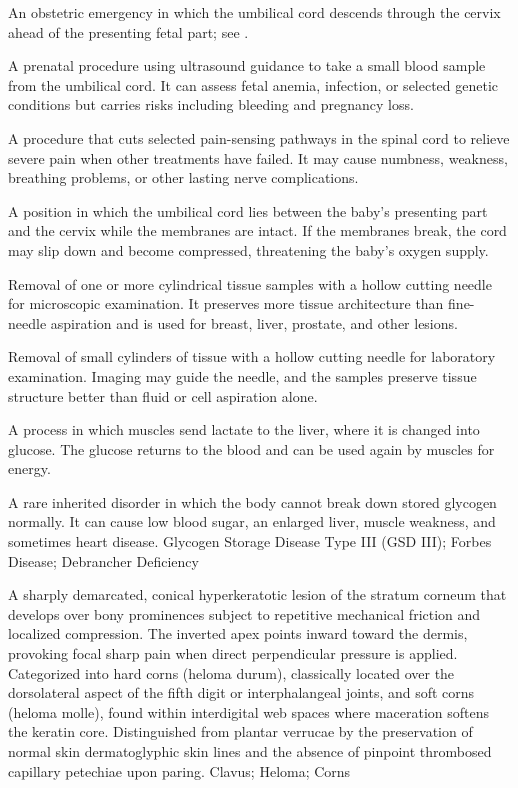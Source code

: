  An obstetric emergency in which the umbilical cord descends through the cervix ahead of the presenting fetal part; see .

 A prenatal procedure using ultrasound guidance to take a small blood sample from the umbilical cord. It can assess fetal anemia, infection, or selected genetic conditions but carries risks including bleeding and pregnancy loss.

 A procedure that cuts selected pain-sensing pathways in the spinal cord to relieve severe pain when other treatments have failed. It may cause numbness, weakness, breathing problems, or other lasting nerve complications.

 A position in which the umbilical cord lies between the baby's presenting part and the cervix while the membranes are intact. If the membranes break, the cord may slip down and become compressed, threatening the baby's oxygen supply.

 Removal of one or more cylindrical tissue samples with a hollow cutting needle for microscopic examination. It preserves more tissue architecture than fine-needle aspiration and is used for breast, liver, prostate, and other lesions.

 Removal of small cylinders of tissue with a hollow cutting needle for laboratory examination. Imaging may guide the needle, and the samples preserve tissue structure better than fluid or cell aspiration alone.

 A process in which muscles send lactate to the liver, where it is changed into glucose. The glucose returns to the blood and can be used again by muscles for energy.

 A rare inherited disorder in which the body cannot break down stored glycogen normally. It can cause low blood sugar, an enlarged liver, muscle weakness, and sometimes heart disease.
\synonyms
Glycogen Storage Disease Type III (GSD III); Forbes Disease; Debrancher Deficiency

 A sharply demarcated, conical hyperkeratotic lesion of the stratum corneum that develops over bony prominences subject to repetitive mechanical friction and localized compression. The inverted apex points inward toward the dermis, provoking focal sharp pain when direct perpendicular pressure is applied. Categorized into hard corns (heloma durum), classically located over the dorsolateral aspect of the fifth digit or interphalangeal joints, and soft corns (heloma molle), found within interdigital web spaces where maceration softens the keratin core. Distinguished from plantar verrucae by the preservation of normal skin dermatoglyphic skin lines and the absence of pinpoint thrombosed capillary petechiae upon paring.
\synonyms
Clavus; Heloma; Corns


